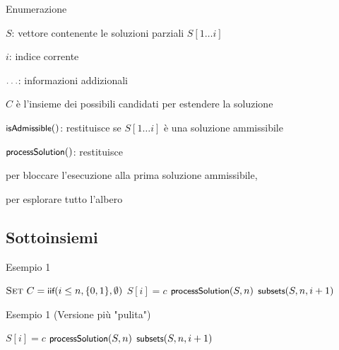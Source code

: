 \begin{frame}{Enumerazione}

\BIL
\item $S$: vettore contenente le soluzioni parziali $S[1 \ldots i]$
\item $i$: indice corrente
\item $\ldots$: informazioni addizionali
\item $C$ è l'insieme dei possibili candidati per estendere la soluzione
\item $\textsf{{\small isAdmissible}}()$: restituisce \TRUE se $S[1 \ldots i]$ è una soluzione ammissibile
\item $\textsf{{\small processSolution}}()$: restituisce 
\BI
\item \TRUE per bloccare l'esecuzione alla prima 
soluzione ammissibile, 
\item \FALSE per esplorare tutto l'albero
\EI
\EIL

\end{frame}

\subsection{Sottoinsiemi}

\begin{frame}{Esempio 1}


\begin{Procedure}
\caption[A]{\enumerasottoinsiemi($\INTEGER[\,]\ S$, \INTEGER $n$, \INTEGER $i$)}
$\textsc{Set}\ C = \textsf{{\small iif}}(i \leq n, \{ 0, 1 \}, \emptyset)$\;
{
  $S[i] = c$\;
  {
    $\textsf{{\small processSolution}}(S,n)$\;
  }
  $\textsf{{\small subsets}}(S, n, i+1)$\;
}
\end{Procedure}


\end{frame}

\begin{frame}{Esempio 1 (Versione più "pulita")}


\begin{Procedure}
\caption[A]{\enumerasottoinsiemi($\INTEGER[\,]\ S$, \INTEGER $n$, \INTEGER $i$)}
{
  $S[i] = c$\;
  {
    $\textsf{{\small processSolution}}(S,n)$\;
  }{
  	$\textsf{{\small subsets}}(S, n, i+1)$\;
	}
}
\end{Procedure}

\end{frame}

